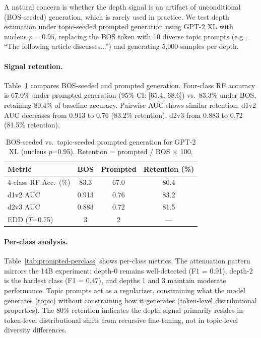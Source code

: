 \documentclass[11pt,a4paper]{article}
\begin{document}
A natural concern is whether the depth signal is an artifact of unconditional (BOS-seeded) generation, which is rarely used in practice. We test depth estimation under topic-seeded prompted generation using GPT-2 XL with nucleus $p = 0.95$, replacing the BOS token with 10 diverse topic prompts (e.g., ``The following article discusses...'') and generating 5{,}000 samples per depth.

\paragraph{Signal retention.} Table~\ref{tab:prompted-comparison} compares BOS-seeded and prompted generation. Four-class RF accuracy is 67.0\% under prompted generation (95\% CI: [65.4, 68.6]) vs.\ 83.3\% under BOS, retaining 80.4\% of baseline accuracy. Pairwise AUC shows similar retention: d1v2 AUC decreases from 0.913 to 0.76 (83.2\% retention), d2v3 from 0.883 to 0.72 (81.5\% retention).

\begin{table}[t]
\centering
\caption{BOS-seeded vs.\ topic-seeded prompted generation for GPT-2 XL (nucleus $p$=0.95). Retention = prompted / BOS $\times$ 100.}
\label{tab:prompted-comparison}
\begin{tabular}{lccc}
\toprule
\textbf{Metric} & \textbf{BOS} & \textbf{Prompted} & \textbf{Retention (\%)} \\
\midrule
4-class RF Acc.\ (\%) & 83.3 & 67.0 & 80.4 \\
d1v2 AUC & 0.913 & 0.76 & 83.2 \\
d2v3 AUC & 0.883 & 0.72 & 81.5 \\
EDD ($T$=0.75) & 3 & 2 & --- \\
\bottomrule
\end{tabular}
\end{table}

\paragraph{Per-class analysis.} Table~\ref{tab:prompted-perclass} shows per-class metrics. The attenuation pattern mirrors the 14B experiment: depth-0 remains well-detected (F1 = 0.91), depth-2 is the hardest class (F1 = 0.47), and depths 1 and 3 maintain moderate performance. Topic prompts act as a regularizer, constraining what the model generates (topic) without constraining how it generates (token-level distributional properties). The 80\% retention indicates the depth signal primarily resides in token-level distributional shifts from recursive fine-tuning, not in topic-level diversity differences.
\end{document}
